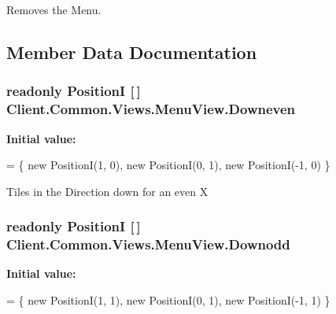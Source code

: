 Removes the Menu. 



\subsection{Member Data Documentation}
\hypertarget{classClient_1_1Common_1_1Views_1_1MenuView_a3c8065c208ad29887f55bb7b7e8f2868}{}
\subsubsection[{Downeven}]{\setlength{\rightskip}{0pt plus 5cm}readonly {\bf Position\+I} \mbox{[}$\,$\mbox{]} Client.\+Common.\+Views.\+Menu\+View.\+Downeven\hspace{0.3cm}{\ttfamily [static]}}\label{classClient_1_1Common_1_1Views_1_1MenuView_a3c8065c208ad29887f55bb7b7e8f2868}
{\bfseries Initial value\+:}
\begin{DoxyCode}
=
            \{   
                \textcolor{keyword}{new} PositionI(1, 0),
                \textcolor{keyword}{new} PositionI(0, 1),
                \textcolor{keyword}{new} PositionI(-1, 0)
            \}
\end{DoxyCode}


Tiles in the Direction down for an even X 

\hypertarget{classClient_1_1Common_1_1Views_1_1MenuView_aa734ab342ead18ae0c228040de94bf7b}{}
\subsubsection[{Downodd}]{\setlength{\rightskip}{0pt plus 5cm}readonly {\bf Position\+I} \mbox{[}$\,$\mbox{]} Client.\+Common.\+Views.\+Menu\+View.\+Downodd\hspace{0.3cm}{\ttfamily [static]}}\label{classClient_1_1Common_1_1Views_1_1MenuView_aa734ab342ead18ae0c228040de94bf7b}
{\bfseries Initial value\+:}
\begin{DoxyCode}
=
            \{
                \textcolor{keyword}{new} PositionI(1, 1),
                \textcolor{keyword}{new} PositionI(0, 1),
                \textcolor{keyword}{new} PositionI(-1, 1)
            \}
\end{DoxyCode}


